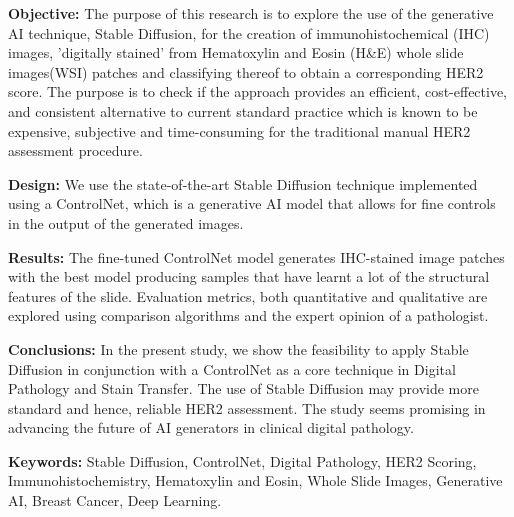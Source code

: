 


\begin{abstracts}        %

\textbf{Objective: }The purpose of this research is to explore the use of the generative AI technique, Stable Diffusion, for the creation of immunohistochemical (IHC) images, 'digitally stained' from Hematoxylin and Eosin (H\&E) whole slide images(WSI) patches and classifying thereof to obtain a corresponding HER2 score. The purpose is to check if the approach provides an efficient, cost-effective, and consistent alternative to current standard practice which is known to be expensive, subjective and time-consuming for the traditional manual HER2 assessment procedure.

\textbf{Design:} We use the state-of-the-art Stable Diffusion technique implemented using a ControlNet, which is a generative AI model that allows for fine controls in the output of the generated images. 

\textbf{Results:} The fine-tuned ControlNet model generates IHC-stained image patches with the best model producing samples that have learnt a lot of the structural features of the slide. Evaluation metrics, both quantitative and qualitative are explored using comparison algorithms and the expert opinion of a pathologist.

\textbf{Conclusions:} In the present study, we show the feasibility to apply Stable Diffusion in conjunction with a ControlNet as a core technique in Digital Pathology and Stain Transfer. The use of Stable Diffusion may provide more standard and hence, reliable HER2 assessment. The study seems promising in advancing the future of AI generators in clinical digital pathology.

\textbf{Keywords:} Stable Diffusion, ControlNet, Digital Pathology, HER2 Scoring, Immunohistochemistry, Hematoxylin and Eosin, Whole Slide Images, Generative AI, Breast Cancer, Deep Learning.



\end{abstracts}



